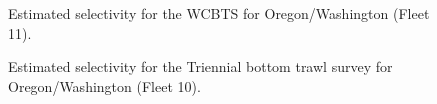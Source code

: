 \documentclass[
]{scrartcl}
\begin{document}
\begin{figure}


\caption{\label{fig-sel11}Estimated selectivity for the WCBTS for
Oregon/Washington (Fleet 11).}

\end{figure}%

\begin{figure}


\caption{\label{fig-sel10}Estimated selectivity for the Triennial bottom
trawl survey for Oregon/Washington (Fleet 10).}

\end{figure}%
\end{document}

